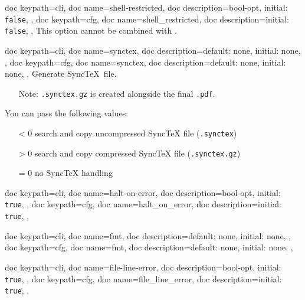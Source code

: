 \documentclass[a4paper, 11pt]{scrartcl}
\let\TeXold\TeX
\renewcommand\TeX{\TeXold\xspace}
\begin{document}
\begin{docKeys}[
	]{
		{
			doc keypath=cli,
			doc name=shell-restricted,
			doc description={bool-opt, initial: \texttt{false}},
		},
		{
			doc keypath=cfg,
			doc name=shell_restricted,
			doc description={initial: \texttt{false}},
		},
	}
	This option cannot be combined with .
\end{docKeys}
\begin{docKeys}[
		doc parameter={=\meta{synctex}},
	]{
		{
			doc keypath=cli,
			doc name=synctex,
			doc description={default: none, initial: none},
		},
		{
			doc keypath=cfg,
			doc name=synctex,
			doc description={default: none, initial: none},
		},
	}
	Generate Sync\TeX\ file.
	\begin{itemize}
		\item[Note:] \texttt{.synctex.gz} is created alongside the final \texttt{.pdf}.
	\end{itemize}

	You can pass the following values:
	\begin{itemize}
		\item[< 0] search and copy uncompressed Sync\TeX file (\texttt{.synctex})
		\item[> 0] search and copy   compressed Sync\TeX file (\texttt{.synctex.gz})
		\item[= 0] no Sync\TeX handling
	\end{itemize}
\end{docKeys}
\begin{docKeys}[
	]{
		{
			doc keypath=cli,
			doc name=halt-on-error,
			doc description={bool-opt, initial: \texttt{true}},
		},
		{
			doc keypath=cfg,
			doc name=halt_on_error,
			doc description={initial: \texttt{true}},
		},
	}
\end{docKeys}
\begin{docKeys}[
		doc parameter={=\meta{fmt}},
	]{
		{
			doc keypath=cli,
			doc name=fmt,
			doc description={default: none, initial: none},
		},
		{
			doc keypath=cfg,
			doc name=fmt,
			doc description={default: none, initial: none},
		},
	}
\end{docKeys}
\begin{docKeys}[
	]{
		{
			doc keypath=cli,
			doc name=file-line-error,
			doc description={bool-opt, initial: \texttt{true}},
		},
		{
			doc keypath=cfg,
			doc name=file_line_error,
			doc description={initial: \texttt{true}},
		},
	}
\end{docKeys}
\end{document}
